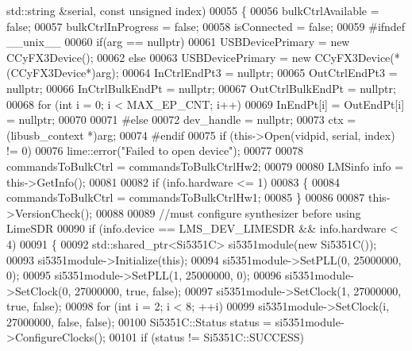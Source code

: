 \begin{DoxyCode}
      std::string &serial, \textcolor{keyword}{const} \textcolor{keywordtype}{unsigned} index)
00055 \{
00056     bulkCtrlAvailable = \textcolor{keyword}{false};
00057     bulkCtrlInProgress = \textcolor{keyword}{false};
00058     isConnected = \textcolor{keyword}{false};
00059 \textcolor{preprocessor}{#ifndef \_\_unix\_\_}
00060     \textcolor{keywordflow}{if}(arg == \textcolor{keyword}{nullptr})
00061         USBDevicePrimary = \textcolor{keyword}{new} CCyFX3Device();
00062     \textcolor{keywordflow}{else}
00063         USBDevicePrimary = \textcolor{keyword}{new} CCyFX3Device(*(CCyFX3Device*)arg);
00064     InCtrlEndPt3 = \textcolor{keyword}{nullptr};
00065     OutCtrlEndPt3 = \textcolor{keyword}{nullptr};
00066     InCtrlBulkEndPt = \textcolor{keyword}{nullptr};
00067     OutCtrlBulkEndPt = \textcolor{keyword}{nullptr};
00068     \textcolor{keywordflow}{for} (\textcolor{keywordtype}{int} i = 0; i < MAX\_EP\_CNT; i++)
00069         InEndPt[i] = OutEndPt[i] = \textcolor{keyword}{nullptr};
00070 
00071 \textcolor{preprocessor}{#else}
00072     dev\_handle = \textcolor{keyword}{nullptr};
00073     ctx = (libusb\_context *)arg;
00074 \textcolor{preprocessor}{#endif}
00075     \textcolor{keywordflow}{if} (this->Open(vidpid, serial, index) != 0)
00076         lime::error(\textcolor{stringliteral}{"Failed to open device"});
00077 
00078     commandsToBulkCtrl = commandsToBulkCtrlHw2;
00079 
00080     LMSinfo info = this->GetInfo();
00081 
00082     \textcolor{keywordflow}{if} (info.hardware <= 1)
00083     \{
00084         commandsToBulkCtrl = commandsToBulkCtrlHw1;
00085     \}
00086 
00087     this->VersionCheck();
00088 
00089     \textcolor{comment}{//must configure synthesizer before using LimeSDR}
00090     \textcolor{keywordflow}{if} (info.device == LMS_DEV_LIMESDR && info.hardware < 4)
00091     \{
00092         std::shared\_ptr<Si5351C> si5351module(\textcolor{keyword}{new} Si5351C());
00093         si5351module->Initialize(\textcolor{keyword}{this});
00094         si5351module->SetPLL(0, 25000000, 0);
00095         si5351module->SetPLL(1, 25000000, 0);
00096         si5351module->SetClock(0, 27000000, \textcolor{keyword}{true}, \textcolor{keyword}{false});
00097         si5351module->SetClock(1, 27000000, \textcolor{keyword}{true}, \textcolor{keyword}{false});
00098         \textcolor{keywordflow}{for} (\textcolor{keywordtype}{int} i = 2; i < 8; ++i)
00099             si5351module->SetClock(i, 27000000, \textcolor{keyword}{false}, \textcolor{keyword}{false});
00100         Si5351C::Status status = si5351module->ConfigureClocks();
00101         \textcolor{keywordflow}{if} (status != Si5351C::SUCCESS)

\end{DoxyCode}
